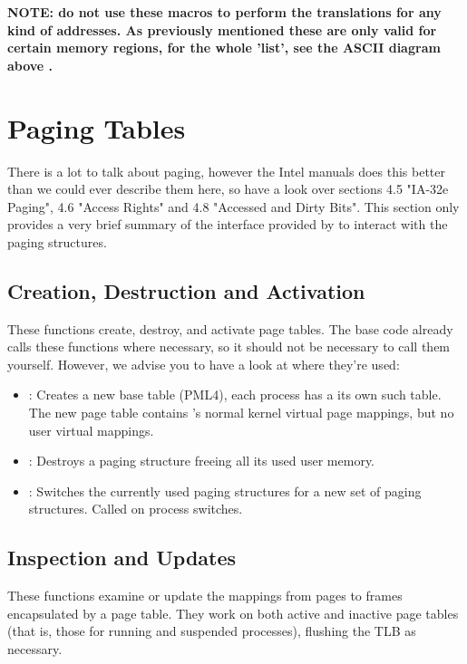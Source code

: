 \begin{appendices}
\textbf{NOTE: do not use these macros to perform the translations for any kind of addresses. As
previously mentioned these are only valid for certain memory regions, for the whole 'list', see the
ASCII diagram above .}

\section{Paging Tables}
\label{sect:PageTables}

There is a lot to talk about paging, however the Intel manuals does this better than we could ever
describe them here, so have a look over \cite{intelSys} sections 4.5 "IA-32e Paging", 4.6 "Access
Rights" and 4.8 "Accessed and Dirty Bits". This section only provides a very brief summary of the
interface provided by \projectname to interact with the paging structures.

\subsection{Creation, Destruction and Activation}

These functions create, destroy, and activate page tables. The base \projectname code already calls
these functions where necessary, so it should not be necessary to call them yourself. However, we
advise you to have a look at where they're used:

\begin{itemize}
	\item {}: Creates a new base table (PML4), each process has a its
own such table.  The new page table contains \projectname's normal kernel virtual page mappings,
but no user virtual mappings.

	\item {}: Destroys a paging structure freeing all its used user
memory.

	\item {}: Switches the currently used paging structures for a new
set of paging structures. Called on process switches.
\end{itemize}


\subsection{Inspection and Updates}

These functions examine or update the mappings from pages to frames encapsulated by a page table.
They work on both active and inactive page tables (that is, those for running and suspended
processes), flushing the TLB as necessary.


\end{appendices}

